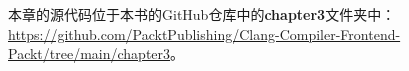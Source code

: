 本章的源代码位于本书的GitHub仓库中的\textbf{chapter3}文件夹中：
 \url{https://github.com/PacktPublishing/Clang-Compiler-Frontend-Packt/tree/main/chapter3}。
